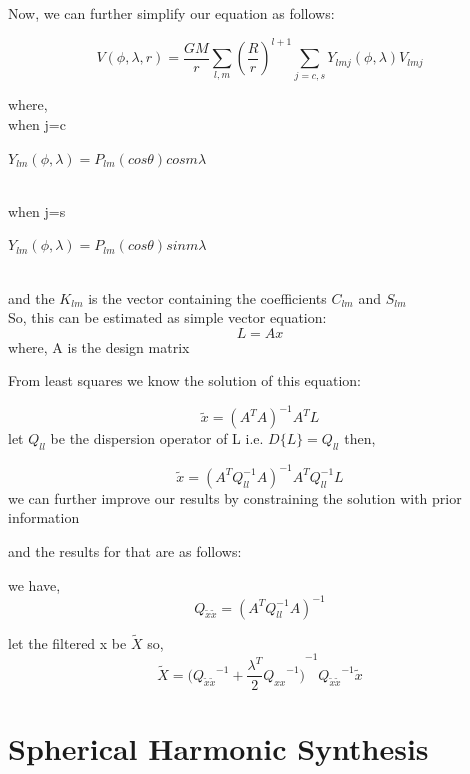 \documentclass[a4paper,12pt]{report}
\begin{document}
Now, we can further simplify our equation as follows:

\begin{equation}
V(\phi,\lambda,r)=\frac{GM}{r}\sum_{l,m}^{} \left(\frac{R}{r}\right)^{l+1}\sum_{j=c,s}^{}  Y_{lmj} (\phi,\lambda) V_{lmj}
\end{equation}

where, \\
 when j=c \centerline{$Y_{lm}(\phi,\lambda)= P_{lm}(cos\theta) cosm\lambda $}\\ 
when j=s \centerline{$Y_{lm} (\phi,\lambda)= P_{lm}(cos\theta) sinm\lambda$
}
\\
and the $K_{lm}$ is the vector containing the coefficients $ C_{lm}$ and $ S_{lm}$
\\ 

So, this can be estimated as simple vector equation:
\begin{equation}
  L= Ax  
\end{equation}
where, A is the design matrix

From least squares we know the solution of this equation:

\begin{equation}
\tilde{x} =(A^T A)^{-1} A^T L
\end{equation}
let $ Q_{ll}$ be the dispersion operator of L i.e. $D\{L\}=Q_{ll}$
then,

\begin{equation}
\tilde{x} =(A^T Q_{ll}^{-1} A)^{-1} A^T Q_{ll}^{-1} L
\end{equation}
 we can further improve our results by constraining the solution with prior information
 
 and the results for that are as follows:
 
 we have,
 \begin{equation}
 Q_{\tilde{x}\tilde{x}} = (A^T Q_{ll}^{-1} A)^{-1}
 \end{equation}
 
 let the filtered x be $\widetilde{X}$
 so, 
 \begin{equation}
 \widetilde{X}= {\Bigg( {Q_{\tilde{x}\tilde{x}}}^{-1} + \frac{\lambda^T}{2}{Q_{xx}}^{-1} \Bigg)}^{-1} {Q_{\tilde{x}     \tilde{x}}}^{-1}  \tilde{x}
 \end{equation}

\chapter{Spherical Harmonic Synthesis}
\end{document}
